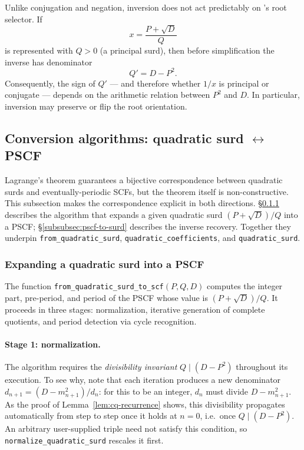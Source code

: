 \begin{remark}
  Unlike conjugation and negation, inversion does not act predictably on
  \catena's root selector.  If
  \[
    x = \frac{P + \sqrt{D}}{Q}
  \]
  is represented with $Q > 0$ (a principal surd), then before simplification
  the inverse has denominator
  \[
    Q' = D - P^2.
  \]
  Consequently, the sign of $Q'$ — and therefore whether $1/x$ is principal
  or conjugate — depends on the arithmetic relation between $P^2$ and $D$.
  In particular, inversion may preserve or flip the root orientation.
\end{remark}


\subsection{Conversion algorithms: quadratic surd $\leftrightarrow$ PSCF}
\label{subsec:conversion}

Lagrange's theorem guarantees a bijective correspondence between quadratic surds
and eventually-periodic SCFs, but the theorem itself is non-constructive.
This subsection makes the correspondence explicit in both directions.
\S\ref{subsubsec:surd-to-pscf} describes the algorithm that expands a given
quadratic surd $(P + \sqrt{D})/Q$ into a PSCF; \S\ref{subsubsec:pscf-to-surd}
describes the inverse recovery.  Together they underpin
\texttt{from\_quadratic\_surd}, \texttt{quadratic\_coefficients}, and
\texttt{quadratic\_surd}.

\subsubsection{Expanding a quadratic surd into a PSCF}
\label{subsubsec:surd-to-pscf}

The function \texttt{from\_quadratic\_surd\_to\_scf}$(P, Q, D)$ computes the
integer part, pre-period, and period of the PSCF whose value is
$(P + \sqrt{D})/Q$.  It proceeds in three stages: normalization, iterative
generation of complete quotients, and period detection via cycle recognition.

\paragraph{Stage 1: normalization.}
The algorithm requires the \emph{divisibility invariant} $Q \mid (D - P^2)$
throughout its execution.  To see why, note that each iteration produces a
new denominator $d_{n+1} = (D - m_{n+1}^2)/d_n$: for this to be an integer,
$d_n$ must divide $D - m_{n+1}^2$.  As the proof of
Lemma~\ref{lem:cq-recurrence} shows, this divisibility propagates
automatically from step to step once it holds at $n = 0$, i.e.\ once
$Q \mid (D - P^2)$.  An arbitrary user-supplied triple need not satisfy this
condition, so \texttt{normalize\_quadratic\_surd} rescales it first.

